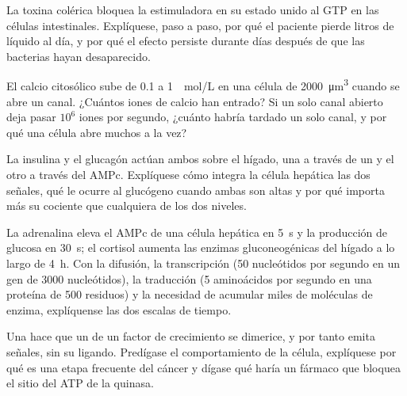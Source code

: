 \begin{exercise}[$\star\star$]\label{exo:b2:cell-signalling:7}
La toxina colérica bloquea la  estimuladora en su estado unido
al GTP en las células intestinales. Explíquese, paso a paso, por qué el
paciente pierde litros de líquido al día, y por qué el efecto persiste
durante días después de que las bacterias hayan desaparecido.
\end{exercise}

\begin{exercise}[$\star\star$]\label{exo:b2:cell-signalling:8}
El calcio citosólico sube de \qty{0.1}{} a \qty{1}{\micro
mol/L} en una célula de \qty{2000}{\micro m^3} cuando se abre un canal.
¿Cuántos iones de calcio han entrado? Si un solo canal abierto deja pasar
$10^{6}$ iones por segundo, ¿cuánto habría tardado un solo canal, y por
qué una célula abre muchos a la vez?
\end{exercise}

\begin{exercise}[$\star\star$]\label{exo:b2:cell-signalling:9}
La insulina y el glucagón actúan ambos sobre el hígado, una a través de un
 y el otro a través del AMPc. Explíquese cómo
integra la célula hepática las dos señales, qué le ocurre al glucógeno
cuando ambas son altas y por qué importa más su cociente que cualquiera de
los dos niveles.
\end{exercise}

\begin{exercise}[$\star\star\star$]\label{exo:b2:cell-signalling:10}
La adrenalina eleva el AMPc de una célula hepática en \qty{5}{s} y la
producción de glucosa en \qty{30}{s}; el cortisol aumenta las enzimas
gluconeogénicas del hígado a lo largo de \qty{4}{h}. Con la difusión, la
transcripción (\qty{50}{} nucleótidos por segundo en un gen de
\qty{3000}{} nucleótidos), la traducción (\qty{5}{} aminoácidos por
segundo en una proteína de \num{500} residuos) y la necesidad de acumular
miles de moléculas de enzima, explíquense las dos escalas de tiempo.
\end{exercise}

\begin{exercise}[$\star\star\star$]\label{exo:b2:cell-signalling:11}
Una  hace que un  de un factor de
crecimiento se dimerice, y por tanto emita señales, sin su ligando.
Predígase el comportamiento de la célula, explíquese por qué es una etapa
frecuente del cáncer y dígase qué haría un fármaco que bloquea el sitio
del ATP de la quinasa.
\end{exercise}

